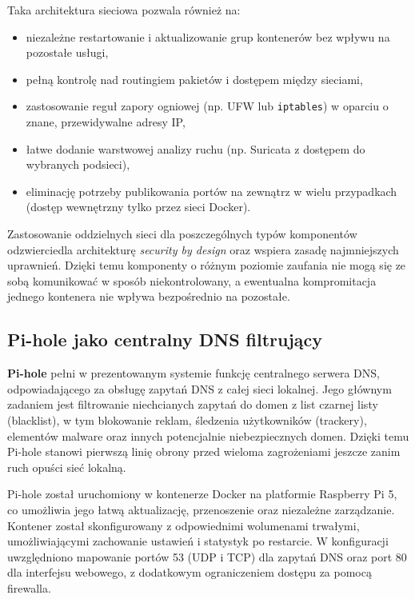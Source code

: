 \documentclass[
    left=2.5cm,         %
    right=2.5cm,        %
    top=2.5cm,          %
    bottom=3cm,         %
    bindingoffset=6mm,  %
    nohyphenation=true %
]{eiti/eiti-thesis} %
\begin{document}
Taka architektura sieciowa pozwala również na:
\begin{itemize}
    \item niezależne restartowanie i aktualizowanie grup kontenerów bez wpływu na pozostałe usługi,
    \item pełną kontrolę nad routingiem pakietów i dostępem między sieciami,
    \item zastosowanie reguł zapory ogniowej (np. UFW lub \texttt{iptables}) w oparciu o znane, przewidywalne adresy IP,
    \item łatwe dodanie warstwowej analizy ruchu (np. Suricata z dostępem do wybranych podsieci),
    \item eliminację potrzeby publikowania portów na zewnątrz w wielu przypadkach (dostęp wewnętrzny tylko przez sieci Docker).
\end{itemize}

Zastosowanie oddzielnych sieci dla poszczególnych typów komponentów odzwierciedla architekturę \textit{security by design} oraz wspiera zasadę najmniejszych uprawnień. Dzięki temu komponenty o różnym poziomie zaufania nie mogą się ze sobą komunikować w sposób niekontrolowany, a ewentualna kompromitacja jednego kontenera nie wpływa bezpośrednio na pozostałe.


\subsection{Pi-hole jako centralny DNS filtrujący}

\textbf{Pi-hole} pełni w prezentowanym systemie funkcję centralnego serwera DNS, odpowiadającego za obsługę zapytań DNS z całej sieci lokalnej. Jego głównym zadaniem jest filtrowanie niechcianych zapytań do domen z list czarnej listy (blacklist), w tym blokowanie reklam, śledzenia użytkowników (trackery), elementów malware oraz innych potencjalnie niebezpiecznych domen. Dzięki temu Pi-hole \cite{pihole-docs} stanowi pierwszą linię obrony przed wieloma zagrożeniami jeszcze zanim ruch opuści sieć lokalną.

Pi-hole został uruchomiony w kontenerze Docker na platformie Raspberry Pi 5, co umożliwia jego łatwą aktualizację, przenoszenie oraz niezależne zarządzanie. Kontener został skonfigurowany z odpowiednimi wolumenami trwałymi, umożliwiającymi zachowanie ustawień i statystyk po restarcie. W konfiguracji uwzględniono mapowanie portów 53 (UDP i TCP) dla zapytań DNS oraz port 80 dla interfejsu webowego, z dodatkowym ograniczeniem dostępu za pomocą firewalla.
\end{document}
